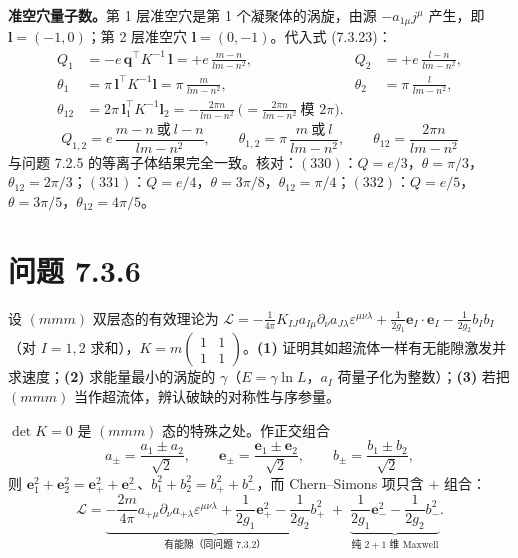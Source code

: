 \textbf{准空穴量子数。}第 1 层准空穴是第 1 个凝聚体的涡旋，由源 $-a_{1\mu}j^\mu$ 产生，即 $\pmb{l}=(-1,0)$；第 2 层准空穴 $\pmb{l}=(0,-1)$。代入式 (7.3.23)：
\begin{align*}
Q_1&=-e\,\pmb{q}^{\top}K^{-1}\,\pmb{l}=+e\,\frac{m-n}{lm-n^2},
&Q_2&=+e\,\frac{l-n}{lm-n^2},\\
\theta_1&=\pi\,\pmb{l}^{\top}K^{-1}\pmb{l}=\pi\,\frac{m}{lm-n^2},
&\theta_2&=\pi\,\frac{l}{lm-n^2},\\
\theta_{12}&=2\pi\,\pmb{l}_1^{\top}K^{-1}\pmb{l}_2=-\frac{2\pi n}{lm-n^2}
\ \Big(=\frac{2\pi n}{lm-n^2}\ \text{模 }2\pi\Big).
\end{align*}
\begin{equation*}
\boxed{\;Q_{1,2}=e\,\frac{m-n\ \text{或}\ l-n}{lm-n^2},
\qquad
\theta_{1,2}=\pi\,\frac{m\ \text{或}\ l}{lm-n^2},
\qquad
\theta_{12}=\frac{2\pi n}{lm-n^2}\;}
\end{equation*}
与问题 7.2.5 的等离子体结果完全一致。核对：$(330)$：$Q=e/3$，$\theta=\pi/3$，$\theta_{12}=2\pi/3$；$(331)$：$Q=e/4$，$\theta=3\pi/8$，$\theta_{12}=\pi/4$；$(332)$：$Q=e/5$，$\theta=3\pi/5$，$\theta_{12}=4\pi/5$。

\section*{问题 7.3.6}
\begin{problem}
设 $(mmm)$ 双层态的有效理论为 $\mathcal{L}=-\frac{1}{4\pi}K_{IJ}a_{I\mu}\partial_\nu a_{J\lambda}\varepsilon^{\mu\nu\lambda}+\frac{1}{2g_1}\pmb{e}_I\cdot\pmb{e}_I-\frac{1}{2g_2}b_Ib_I$（对 $I=1,2$ 求和），$K=m\begin{pmatrix}1&1\\1&1\end{pmatrix}$。\textbf{(1)} 证明其如超流体一样有无能隙激发并求速度；\textbf{(2)} 求能量最小的涡旋的 $\gamma$（$E=\gamma\ln L$，$a_I$ 荷量子化为整数）；\textbf{(3)} 若把 $(mmm)$ 当作超流体，辨认破缺的对称性与序参量。
\end{problem}
\solution
$\det K=0$ 是 $(mmm)$ 态的特殊之处。作正交组合
\begin{equation*}
a_\pm=\frac{a_1\pm a_2}{\sqrt2},\qquad
\pmb{e}_\pm=\frac{\pmb{e}_1\pm\pmb{e}_2}{\sqrt2},\qquad
b_\pm=\frac{b_1\pm b_2}{\sqrt2},
\end{equation*}
则 $\pmb{e}_1^2+\pmb{e}_2^2=\pmb{e}_+^2+\pmb{e}_-^2$、$b_1^2+b_2^2=b_+^2+b_-^2$，而 Chern--Simons 项只含 $+$ 组合：
\begin{equation*}
\mathcal{L}=\underbrace{-\frac{2m}{4\pi}a_{+\mu}\partial_\nu a_{+\lambda}\varepsilon^{\mu\nu\lambda}
+\frac{1}{2g_1}\pmb{e}_+^2-\frac{1}{2g_2}b_+^2}_{\text{有能隙（同问题 7.3.2）}}
\;+\;\underbrace{\frac{1}{2g_1}\pmb{e}_-^2-\frac{1}{2g_2}b_-^2}_{\text{纯 }2+1\text{ 维 Maxwell}} .
\end{equation*}

